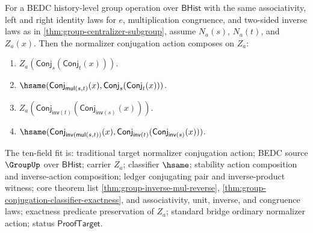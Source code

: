 \begin{theorem}
\label{thm:group-normalizer-conjugation-action-composition}
For a BEDC history-level group operation over $\mathsf{BHist}$ with the same
associativity, left and right identity laws for $e$, multiplication
congruence, and two-sided inverse laws as in
\autoref{thm:group-centralizer-subgroup}, assume $N_a(s)$, $N_a(t)$, and
$Z_a(x)$. Then the normalizer conjugation action composes on $Z_a$:
\begin{enumerate}
\item $Z_a(\mathsf{Conj}_s(\mathsf{Conj}_t(x)))$.
\item
$\hsame(\mathsf{Conj}_{\mathsf{mul}(s,t)}(x),
\mathsf{Conj}_s(\mathsf{Conj}_t(x)))$.
\item
$Z_a(\mathsf{Conj}_{\mathsf{inv}(t)}
(\mathsf{Conj}_{\mathsf{inv}(s)}(x)))$.
\item
$\hsame(\mathsf{Conj}_{\mathsf{inv}(\mathsf{mul}(s,t))}(x),
\mathsf{Conj}_{\mathsf{inv}(t)}
(\mathsf{Conj}_{\mathsf{inv}(s)}(x)))$.
\end{enumerate}
The ten-field fit is: traditional target normalizer conjugation action; BEDC
source $\GroupUp$ over $\mathsf{BHist}$; carrier $Z_a$; classifier $\hsame$;
stability action composition and inverse-action composition; ledger
conjugating pair and inverse-product witness; core theorem list
\autoref{thm:group-inverse-mul-reverse},
\autoref{thm:group-conjugation-classifier-exactness}, and associativity,
unit, inverse, and congruence laws; exactness predicate preservation of
$Z_a$; standard bridge ordinary normalizer action; status
$\mathsf{ProofTarget}$.
\end{theorem}
